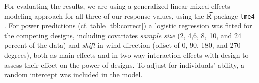 

For evaluating the results, we are using a generalized linear mixed effects modeling  approach \cite{pinheiro:2000} for all three of our response values, using the {\t R} package {\tt lme4} \cite{bates:2011}. 
For power predictions (cf. table \ref{tbl:correct}) a logistic regression was fitted for the competing designs, including covariates {\it sample size} (2, 4,6, 8, 10, and 24 percent of the data) and {\it shift} in wind direction (offset of 0, 90, 180, and 270 degrees), both as main effects and in two-way interaction effects with design to assess their effect on the power of designs. To adjust for individuals' ability, a random intercept was included in the model.


